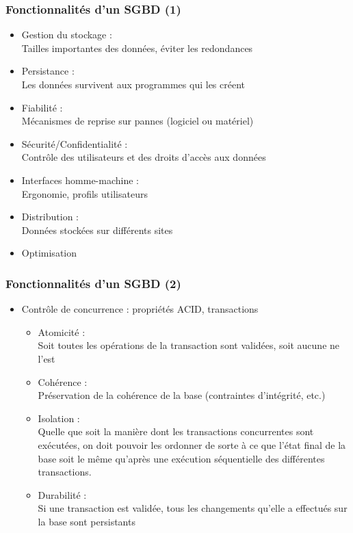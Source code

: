 \begin{frame}
  \frametitle{Fonctionnalités d'un SGBD (1)}
  \begin{itemize}
    \item Gestion du stockage :\\
      Tailles importantes des données, éviter les redondances
    \item Persistance :\\
      Les données survivent aux programmes qui les créent
    \item Fiabilité :\\
      Mécanismes de reprise sur pannes (logiciel ou matériel)
    \item Sécurité/Confidentialité :\\
      Contrôle des utilisateurs et des droits d'accès aux données
    \item Interfaces homme-machine :\\
      Ergonomie, profils utilisateurs
    \item Distribution :\\
      Données stockées sur différents sites
    \item Optimisation
  \end{itemize}
\end{frame}

\begin{frame}
\frametitle{Fonctionnalités d'un SGBD (2)}
\begin{itemize}
  \item Contrôle de concurrence : propriétés ACID, transactions
    \begin{itemize}
      \item Atomicité :\\
        Soit toutes les opérations de la transaction sont validées, soit aucune ne l'est
      \item Cohérence :\\
        Préservation de la cohérence de la base (contraintes d'intégrité, etc.)
      \item Isolation :\\
        Quelle que soit la manière dont les transactions concurrentes sont exécutées, on doit pouvoir les
        ordonner de sorte à ce que l'état final de la base soit le même qu'après une exécution séquentielle
        des différentes transactions.
    \item Durabilité :\\
      Si une transaction est validée, tous les changements qu'elle a effectués sur la base sont persistants
    \end{itemize}
\end{itemize}
\end{frame}

